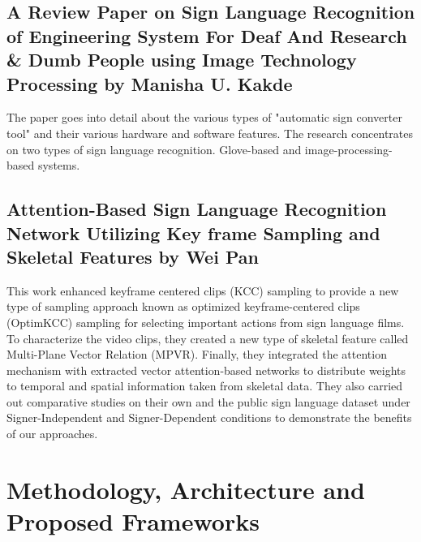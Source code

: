 \documentclass[12pt,a4paper]{report}
\begin{document}
\subsection{A Review Paper on Sign Language Recognition of Engineering System For Deaf And Research \& Dumb People using Image Technology Processing by Manisha U. Kakde\cite{b3}}
The paper goes into detail about the various types of "automatic sign converter tool" and their various hardware and software features. The research concentrates on two types of sign language recognition. Glove-based and image-processing-based systems.

\subsection{Attention-Based Sign Language Recognition Network Utilizing Key frame Sampling and Skeletal Features by Wei Pan\cite{b4}}
This work enhanced keyframe centered clips (KCC) sampling to provide a new type of sampling approach known as optimized keyframe-centered clips (OptimKCC) sampling for selecting important actions from sign language films. To characterize the video clips, they created a new type of skeletal feature called Multi-Plane Vector Relation (MPVR). Finally, they integrated the attention mechanism with extracted vector attention-based networks to distribute weights to temporal and spatial information taken from skeletal data. They also carried out comparative studies on their own and the public sign language dataset under Signer-Independent and Signer-Dependent conditions to demonstrate the benefits of our approaches.

\section{Methodology, Architecture and Proposed Frameworks}
\end{document}
